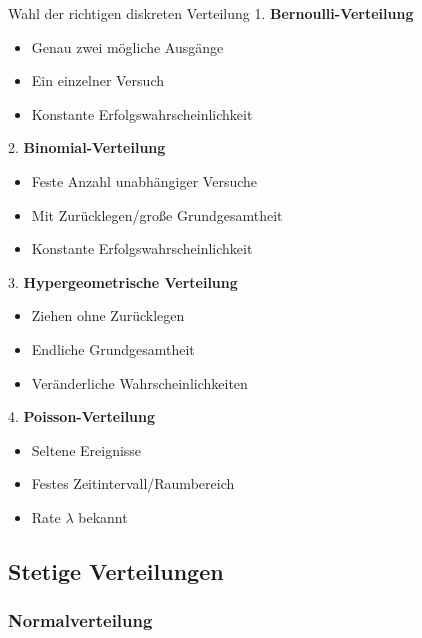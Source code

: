 \begin{KR}{Wahl der richtigen diskreten Verteilung}
1. \textbf{Bernoulli-Verteilung}
   \begin{itemize}
   \item Genau zwei mögliche Ausgänge
   \item Ein einzelner Versuch
   \item Konstante Erfolgswahrscheinlichkeit
   \end{itemize}

2. \textbf{Binomial-Verteilung}
   \begin{itemize}
   \item Feste Anzahl unabhängiger Versuche
   \item Mit Zurücklegen/große Grundgesamtheit
   \item Konstante Erfolgswahrscheinlichkeit
   \end{itemize}

3. \textbf{Hypergeometrische Verteilung}
   \begin{itemize}
   \item Ziehen ohne Zurücklegen
   \item Endliche Grundgesamtheit
   \item Veränderliche Wahrscheinlichkeiten
   \end{itemize}

4. \textbf{Poisson-Verteilung}
   \begin{itemize}
   \item Seltene Ereignisse
   \item Festes Zeitintervall/Raumbereich
   \item Rate $\lambda$ bekannt
   \end{itemize}
\end{KR}


\subsection{Stetige Verteilungen}

\subsubsection{Normalverteilung}

